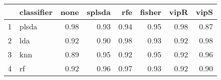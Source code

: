 \begin{table}[ht]
\centering
\begin{tabular}{rlrrrrrr}
  \hline
 & classifier & none & splsda & rfe & fisher & vipR & vipS \\ 
  \hline
1 & plsda & 0.98 & 0.93 & 0.94 & 0.95 & 0.98 & 0.87 \\ 
  2 & lda & 0.92 & 0.90 & 0.98 & 0.93 & 0.92 & 0.98 \\ 
  3 & knn & 0.89 & 0.95 & 0.92 & 0.95 & 0.92 & 0.96 \\ 
  4 & rf & 0.92 & 0.96 & 0.97 & 0.93 & 0.92 & 0.90 \\ 
   \hline
\end{tabular}
\end{table}
